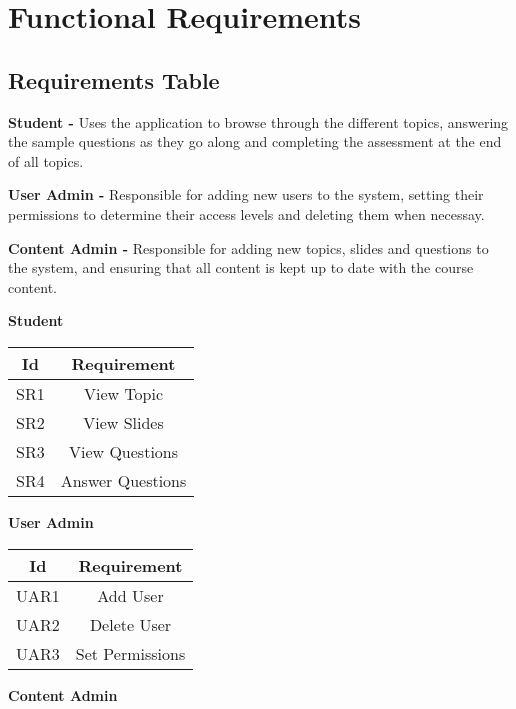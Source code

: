 \documentclass{l3proj}
\begin{document}
\section{Functional Requirements}

\subsection{Requirements Table}

\textbf{Student -} Uses the application to browse through the different topics, answering the sample questions as they go along and completing the assessment at the end of all topics.

\textbf{User Admin -} Responsible for adding new users to the system, setting their permissions to determine their access levels and deleting them when necessay.

\textbf{Content Admin -} Responsible for adding new topics, slides and questions to the system, and ensuring that all content is kept up to date with the course content.

\textbf{Student}\\

\begin{center}
\begin{tabular}{|c|c|}
\hline \textbf{Id} & \textbf{Requirement}\\
\hline SR1 & View Topic\\
\hline SR2 & View Slides\\
\hline SR3 & View Questions\\
\hline SR4 & Answer Questions\\
\hline 
\end{tabular}
\end{center}

\textbf{User Admin}\\

\begin{center}
\begin{tabular}{|c|c|}
\hline \textbf{Id} & \textbf{Requirement}\\
\hline UAR1 & Add User\\
\hline UAR2 & Delete User\\
\hline UAR3 & Set Permissions\\
\hline 
\end{tabular}
\end{center}

\textbf{Content Admin}\\
\end{document}
